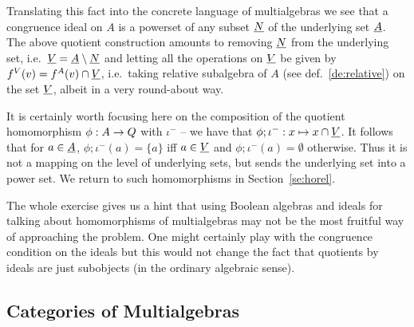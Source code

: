 \documentclass[10pt]{article}
\begin{document}
Translating this fact into the concrete language of multialgebras we
see that a congruence ideal on $A$ is a powerset of any subset $\underline {N}$ of the underlying set $\underline {A}$.  The above quotient construction
amounts to removing $\underline {N}$ from the underlying set, i.e.\ $\underline {V}=\underline {A}\setminus\underline {N}$ and letting all the operations on $\underline {V}$ be given by $f^V(v) = f^A(v)\cap \underline {V}$, i.e.\ taking
relative subalgebra of $A$ (see def.~\ref{de:relative}) on the set
$\underline {V}$, albeit in a very round-about way.

It is certainly worth focusing here on the composition of the quotient
homomorphism $\phi: A \rightarrow Q$ with $\iota^-$ -- we have that
$\phi;\iota^- : x \mapsto x\cap\underline {V}$. It follows that for $a
\in\underline {A}$, $\phi;\iota^-(a) = \{a\}$ iff $a\in\underline {V}$ and
$\phi;\iota^-(a) = \emptyset$ otherwise. Thus it is not a mapping on
the level of underlying sets, but sends the underlying set into a
power set. We return to such homomorphisms in Section~\ref{se:horel}.

The whole exercise gives us a hint that using Boolean algebras and
ideals for talking about homomorphisms of multialgebras may not be the
most fruitful way of approaching the problem. One might certainly play
with the congruence condition on the ideals but this would not change
the fact that quotients by ideals are just subobjects (in the ordinary
algebraic sense). 



\subsection{Categories of Multialgebras}
\label{sub:cats}
\end{document}
